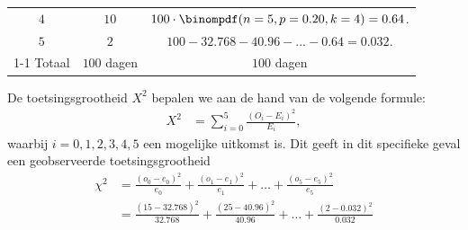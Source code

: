 {\begin{center}
\begin{tabular}{ccc}
                $4$ & $10$ & $100 \cdot \binompdf(n=5, p=0.20, k=4) = 0.64$. \\
                $5$ & $2$  & $100 - 32.768 - 40.96 - \ldots - 0.64 = 0.032$. \\
            \cmidrule{1-1} \cmidrule{2-2} \cmidrule{3-3}
                Totaal & $100$ dagen & $100$ dagen \\
            \bottomrule
        \end{tabular}
    \end{center}
    De toetsingsgrootheid $X^2$ bepalen we aan de hand van de volgende formule:
    \begin{align*}
        X^2  &= \sum_{i=0}^5 \frac{(O_{i} - E_{i})^2}{E_{i}},
    \end{align*}
    waarbij $i = 0,1,2,3,4,5$ een mogelijke uitkomst is.
    Dit geeft in dit specifieke geval een geobserveerde toetsingsgrootheid 
    \begin{align*}
        \chi^2 &= \frac{(o_{0} - e_{0})^2}{e_{0}} + \frac{(o_{1} - e_{1})^2}{e_{1}} + \ldots + \frac{(o_{5} - e_{5})^2}{e_{5}}\\
                &= \frac{(15 - 32.768)^2}{32.768} + \frac{(25 - 40.96)^2}{40.96} + \ldots + \frac{(2 - 0.032)^2}{0.032}\\

\end{align*}}
